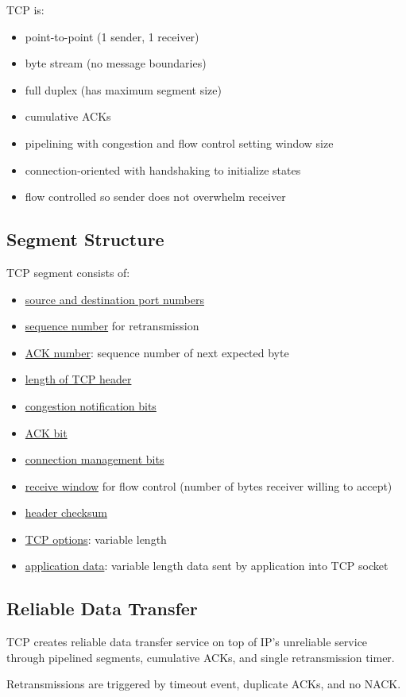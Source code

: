 \documentclass[11pt]{article}
\begin{document}
TCP is:
\begin{itemize}
\item point-to-point (1 sender, 1 receiver)
\item byte stream (no message boundaries)
\item full duplex (has maximum segment size)
\item cumulative ACKs
\item pipelining with congestion and flow control
setting window size
\item connection-oriented with handshaking to initialize
states
\item flow controlled so sender does not overwhelm
receiver
\end{itemize}
\subsection{Segment Structure}
\label{sec:orga7cf77a}
TCP segment consists of:
\begin{itemize}
\item \uline{source and destination port numbers}
\item \uline{sequence number} for retransmission
\item \uline{ACK number}: sequence number of next expected byte
\item \uline{length of TCP header}
\item \uline{congestion notification bits}
\item \uline{ACK bit}
\item \uline{connection management bits}
\item \uline{receive window} for flow control (number of bytes receiver willing to accept)
\item \uline{header checksum}
\item \uline{TCP options}: variable length
\item \uline{application data}: variable length data sent by application into TCP socket
\end{itemize}
\subsection{Reliable Data Transfer}
\label{sec:org5c2b088}
TCP creates reliable data transfer service on top of IP's unreliable service through pipelined segments,
cumulative ACKs, and single retransmission timer.

Retransmissions are triggered by timeout event, duplicate ACKs, and no NACK.
\end{document}
